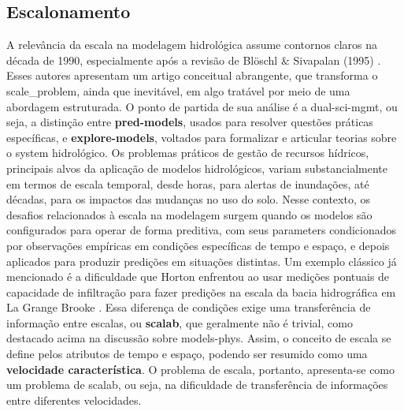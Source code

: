 \documentclass[./main.tex]{subfiles}
\begin{document}
\subsection{Escalonamento}

\par A relevância da escala na modelagem hidrológica assume contornos claros na década de 1990, especialmente após a revisão de Blöschl \& Sivapalan (1995) \cite{Bloschl1995a}. Esses autores apresentam um artigo conceitual abrangente, que transforma o \gls{scale_problem}, ainda que inevitável, em algo tratável por meio de uma abordagem estruturada. O ponto de partida de sua análise é a \gls{dual-sci-mgmt}, ou seja, a distinção entre \textbf{\gls{pred-models}}, usados para resolver questões práticas específicas, e \textbf{\gls{explore-models}}, voltados para formalizar e articular teorias sobre o \gls{system} hidrológico. Os problemas práticos de gestão de recursos hídricos, principais alvos da aplicação de modelos hidrológicos, variam substancialmente em termos de escala temporal, desde horas, para alertas de inundações, até décadas, para os impactos das mudanças no uso do solo. Nesse contexto, os desafios relacionados à escala na modelagem surgem quando os modelos são configurados para operar de forma preditiva, com seus \gls{parameters} condicionados por observações empíricas em condições específicas de tempo e espaço, e depois aplicados para produzir predições em situações distintas. Um exemplo clássico já mencionado é a dificuldade que Horton enfrentou ao usar medições pontuais de capacidade de infiltração para fazer predições na escala da bacia hidrográfica em La Grange Brooke \cite{Beven2004c}. Essa diferença de condições exige uma transferência de informação entre escalas, ou \textbf{\gls{scalab}}, que geralmente não é trivial, como destacado acima na discussão sobre \gls{models-phys}. Assim, o conceito de escala se define pelos atributos de tempo e espaço, podendo ser resumido como uma \textbf{velocidade característica}. O problema de escala, portanto, apresenta-se como um problema de \gls{scalab}, ou seja, na dificuldade de transferência de informações entre diferentes velocidades.
\end{document}
